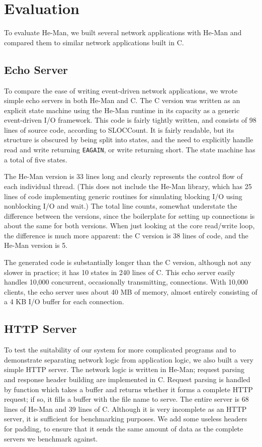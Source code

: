 \documentclass[preprint]{sigplanconf}
\renewcommand{\t}{\texttt}
\begin{document}
\section{Evaluation}\label{sec:evaluation}

To evaluate He-Man, we built several network applications with He-Man
and compared them to similar network applications built in C.

\subsection{Echo Server}

To compare the ease of writing event-driven network applications, we wrote
simple echo servers in both He-Man and C. The C version was written as an
explicit state machine using the He-Man runtime in its capacity as a generic
event-driven I/O framework.  This code is fairly tightly written, and consists
of 98 lines of source code, according to SLOCCount.  It is fairly readable, but
its structure is obscured by being split into states, and the need to explicitly
handle read and write returning \t{EAGAIN}, or write returning short. The state
machine has a total of five states.

The He-Man version is 33 lines long and clearly represents the control flow of
each individual thread. (This does not include the He-Man library, which has 25
lines of code implementing generic routines for simulating blocking I/O using
nonblocking I/O and wait.) The total line counts, somewhat understate the
difference between the versions, since the boilerplate for setting up
connections is about the same for both versions. When just looking at the core
read/write loop, the difference is much more apparent: the C version is 38 lines
of code, and the He-Man version is 5.

The generated code is substantially longer than the C version, although not any
slower in practice; it has 10 states in 240 lines of C. This echo server easily
handles 10,000 concurrent, occasionally transmitting, connections.  With 10,000
clients, the echo server uses about 40 MB of memory, almost entirely consisting
of a 4 KB I/O buffer for each connection.

\subsection{HTTP Server}

To test the suitability of our system for more complicated programs and to
demonstrate separating network logic from application logic, we also built a
very simple HTTP server. The network logic is written in He-Man; request parsing
and response header building are implemented in C. Request parsing is handled by
function which takes a buffer and returns whether it forms a complete HTTP
request; if so, it fills a buffer with the file name to serve. The entire server
is 68 lines of He-Man and 39 lines of C. Although it is very incomplete as an
HTTP server, it is sufficient for benchmarking purposes. We add some useless
headers for padding, to ensure that it sends the same amount of data as the
complete servers we benchmark against.
\end{document}
